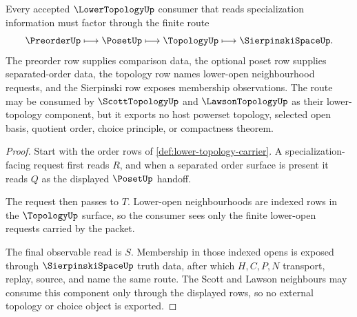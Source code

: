 \begin{theorem}
\label{thm:lower-topology-specialization-scope}
Every accepted $\LowerTopologyUp$ consumer that reads specialization information must factor through the finite route
$$
\PreorderUp \longmapsto \PosetUp \longmapsto \TopologyUp \longmapsto \SierpinskiSpaceUp .
$$
The preorder row supplies comparison data, the optional poset row supplies separated-order data, the topology row names lower-open neighbourhood requests, and the Sierpinski row exposes membership observations. The route may be consumed by $\ScottTopologyUp$ and $\LawsonTopologyUp$ as their lower-topology component, but it exports no host powerset topology, selected open basis, quotient order, choice principle, or compactness theorem.
\end{theorem}
\begin{proof}
Start with the order rows of \autoref{def:lower-topology-carrier}. A specialization-facing request first reads $R$, and when a separated order surface is present it reads $Q$ as the displayed $\PosetUp$ handoff.

The request then passes to $T$. Lower-open neighbourhoods are indexed rows in the $\TopologyUp$ surface, so the consumer sees only the finite lower-open requests carried by the packet.

The final observable read is $S$. Membership in those indexed opens is exposed through $\SierpinskiSpaceUp$ truth data, after which $H,C,P,N$ transport, replay, source, and name the same route. The Scott and Lawson neighbours may consume this component only through the displayed rows, so no external topology or choice object is exported.
\end{proof}




